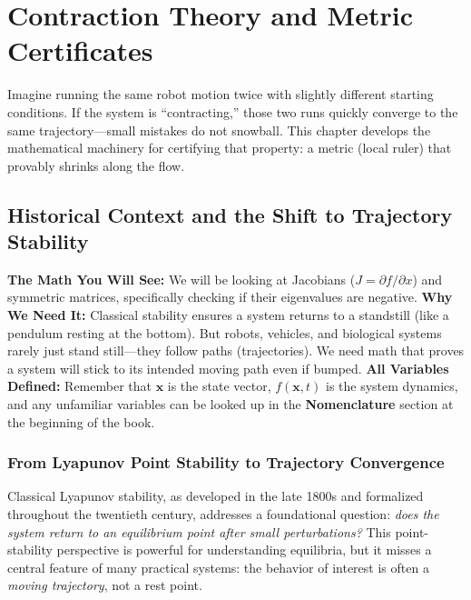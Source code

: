 \chapter{Contraction Theory and Metric Certificates}
\label{ch:contraction}

\begin{laymansbox}
Imagine running the same robot motion twice with slightly different starting conditions.
If the system is ``contracting,'' those two runs quickly converge to the same
trajectory---small mistakes do not snowball. This chapter develops the mathematical
machinery for certifying that property: a metric (local ruler) that provably shrinks
along the flow.
\end{laymansbox}

\section{Historical Context and the Shift to Trajectory Stability}

\begin{laymansbox}
\textbf{The Math You Will See:} We will be looking at Jacobians ($J = \partial f / \partial x$) and symmetric matrices, specifically checking if their eigenvalues are negative. 
\textbf{Why We Need It:} Classical stability ensures a system returns to a standstill (like a pendulum resting at the bottom). But robots, vehicles, and biological systems rarely just stand still—they follow paths (trajectories). We need math that proves a system will stick to its intended moving path even if bumped. 
\textbf{All Variables Defined:} Remember that $\mathbf{x}$ is the state vector, $f(\mathbf{x}, t)$ is the system dynamics, and any unfamiliar variables can be looked up in the \textbf{Nomenclature} section at the beginning of the book.
\end{laymansbox}


\subsection{From Lyapunov Point Stability to Trajectory Convergence}

Classical Lyapunov stability, as developed in the late 1800s and formalized throughout
the twentieth century, addresses a foundational question: \emph{does the system return
to an equilibrium point after small perturbations?} This point-stability perspective is
powerful for understanding equilibria, but it misses a central feature of many practical
systems: the behavior of interest is often a \emph{moving trajectory}, not a rest point.

